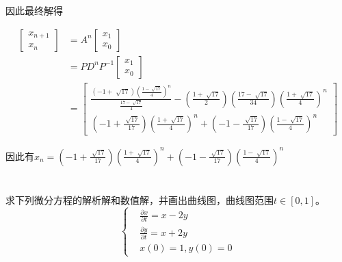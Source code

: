 因此最终解得

\begin{equation}
    \begin{aligned}
    \begin{bmatrix}
        x_{n+1} \\
        x_{n} 
    \end{bmatrix} &= 
    A^n
    \begin{bmatrix}
        x_{1} \\
        x_0
    \end{bmatrix}\\
     &= PD^nP^{-1}\begin{bmatrix}
        x_{1} \\
        x_0
    \end{bmatrix}\\
    &= \begin{bmatrix}
        \frac{(-1 + \sqrt[]{17})(\frac{1-\sqrt[]{17}}{4})^n}{\frac{17-\sqrt[]{17}}{4}} - (\frac{1+\sqrt[]{17}}{2})(\frac{17-\sqrt[]{17}}{34})(\frac{1+\sqrt[]{17}}{4})^n \\
        (-1+\frac{\sqrt[]{17}}{17})(\frac{1+\sqrt[]{17}}{4})^n+(-1-\frac{\sqrt[]{17}}{17})( \frac{1-\sqrt[]{17}}{4} )^n
    \end{bmatrix}
\end{aligned}
\end{equation}

因此有$x_n = (-1+\frac{\sqrt[]{17}}{17})(\frac{1+\sqrt[]{17}}{4})^n+(-1-\frac{\sqrt[]{17}}{17})( \frac{1-\sqrt[]{17}}{4} )^n$

\chapter{}


求下列微分方程的解析解和数值解，并画出曲线图，曲线图范围$t\in[0,1]$。
\begin{equation*}
    \left \{
        \begin{aligned}
            &\frac{\partial x}{\partial t} = x - 2y\\
            &\frac{\partial y}{\partial t} = x + 2y\\
            &x(0)=1, y(0) = 0
        \end{aligned}
    \right . 
\end{equation*}